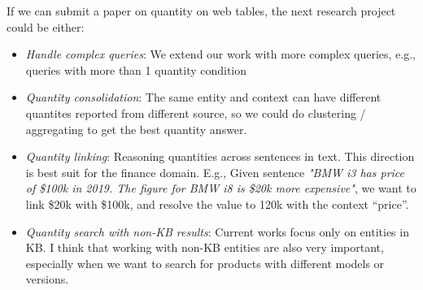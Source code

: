 \documentclass{article}
\begin{document}
If we can submit a paper on quantity on web tables, the next research project could be either:

\begin{itemize}
\item \textit{Handle complex queries}: We extend our work with more complex queries, e.g., queries with more than 1 quantity condition
\item \textit{Quantity consolidation}: The same entity and context can have different quantites reported from different source, so we could do clustering / aggregating to get the best quantity answer.
\item \textit{Quantity linking}: Reasoning quantities across sentences in text. This direction is best suit for the finance domain. E.g., Given sentence \textit{"BMW i3 has price of \$100k in 2019. The figure for BMW i8 is \$20k more expensive"}, we want to link \$20k with \$100k, and resolve the value to 120k with the context ``price''.
\item \textit{Quantity search with non-KB results}: Current works focus only on entities in KB. I think that working with non-KB entities are also very important, especially when we want to search for products with different models or versions. 
\end{itemize}

%
%
\end{document}
